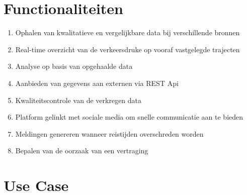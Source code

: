 \documentclass[ps,a4paper,oneside]{report}
\begin{document}
\section{Functionaliteiten}
\begin{enumerate}
\item Ophalen van kwalitatieve en vergelijkbare data bij verschillende bronnen
\item Real-time overzicht van de verkeersdruke op vooraf vastgelegde trajecten
\item Analyse op basis van opgehaalde data
\item Aanbieden van gegevens aan externen via REST Api
\item Kwaliteitscontrole van de verkregen data
\item Platform gelinkt met sociale media om snelle communicatie aan te bieden
\item Meldingen genereren wanneer reistijden overschreden worden
\item Bepalen van de oorzaak van een vertraging
\end{enumerate}
\section{Use Case}
\end{document}
